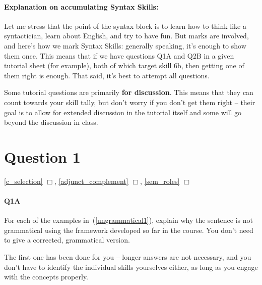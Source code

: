 \documentclass{article}
\begin{document}
\maketitle
\subtitle{Tutorial Notes Week 6: Topics 4, 5 \& 6}

\paragraph{Explanation on accumulating Syntax Skills:} Let me stress that the point of the syntax block is to learn how to think like a syntactician, learn about English, and try to have fun. But marks are involved, and here's how we mark Syntax Skills: generally speaking, it's enough to show them once. This means that if we have questions Q1A and Q2B in a given tutorial sheet (for example), both of which target skill 6b, then getting one of them right is enough. That said, it's best to attempt all questions.

Some tutorial questions are primarily \textbf{for discussion}. This means that they can count towards your skill tally, but don't worry if you don't get them right -- their goal is to allow for extended discussion in the tutorial itself and some will go beyond the discussion in class.

\section*{Question 1}
\hfill{} \ref{c_selection} $\Box$, \ref{adjunct_complement} $\Box$, \ref{sem_roles} $\Box$

\paragraph{Q1A} For each of the examples in~(\ref{ungrammatical1}), explain why the sentence is not grammatical using the framework developed so far in the course. You don't need to give a corrected, grammatical version.

The first one has been done for you -- longer answers are not necessary, and you don't have to identify the individual skills yourselves either, as long as you engage with the concepts properly.
\end{document}
